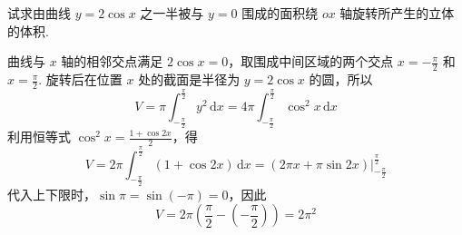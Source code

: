 \begin{problem}
试求由曲线 \(y=2\cos x\) 之一半被与 \(y=0\) 围成的面积绕 \(ox\) 轴旋转所产生的立体的体积.
\end{problem}

\begin{solution}
曲线与 \(x\) 轴的相邻交点满足 \(2\cos x=0\)，取围成中间区域的两个交点
\(x=-\frac{\pi}{2}\) 和 \(x=\frac{\pi}{2}\). 旋转后在位置 \(x\) 处的截面是半径为 \(y=2\cos x\) 的圆，所以
\[
V=\pi\int_{-\frac{\pi}{2}}^{\frac{\pi}{2}}y^2\,\mathrm{d}x
=4\pi\int_{-\frac{\pi}{2}}^{\frac{\pi}{2}}\cos^2x\,\mathrm{d}x
\]
利用恒等式 \(\cos^2x=\frac{1+\cos2x}{2}\)，得
\[
V=2\pi\int_{-\frac{\pi}{2}}^{\frac{\pi}{2}}\left(1+\cos2x\right)\,\mathrm{d}x
=\left(2\pi x+\pi\sin2x\right)\bigg|_{-\frac{\pi}{2}}^{\frac{\pi}{2}}
\]
代入上下限时，\(\sin\pi=\sin(-\pi)=0\)，因此
\[
V=2\pi\left(\frac{\pi}{2}-\left(-\frac{\pi}{2}\right)\right)=2\pi^2
\]
\end{solution}
